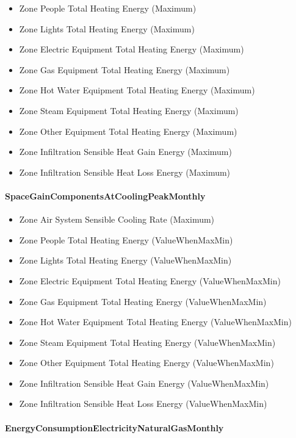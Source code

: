\begin{itemize}
\item
  Zone People Total Heating Energy (Maximum)
\item
  Zone Lights Total Heating Energy (Maximum)
\item
  Zone Electric Equipment Total Heating Energy (Maximum)
\item
  Zone Gas Equipment Total Heating Energy (Maximum)
\item
  Zone Hot Water Equipment Total Heating Energy (Maximum)
\item
  Zone Steam Equipment Total Heating Energy (Maximum)
\item
  Zone Other Equipment Total Heating Energy (Maximum)
\item
  Zone Infiltration Sensible Heat Gain Energy (Maximum)
\item
  Zone Infiltration Sensible Heat Loss Energy (Maximum)
\end{itemize}

\paragraph{SpaceGainComponentsAtCoolingPeakMonthly}\label{spacegaincomponentsatcoolingpeakmonthly}

\begin{itemize}
\item
  Zone Air System Sensible Cooling Rate (Maximum)
\item
  Zone People Total Heating Energy (ValueWhenMaxMin)
\item
  Zone Lights Total Heating Energy (ValueWhenMaxMin)
\item
  Zone Electric Equipment Total Heating Energy (ValueWhenMaxMin)
\item
  Zone Gas Equipment Total Heating Energy (ValueWhenMaxMin)
\item
  Zone Hot Water Equipment Total Heating Energy (ValueWhenMaxMin)
\item
  Zone Steam Equipment Total Heating Energy (ValueWhenMaxMin)
\item
  Zone Other Equipment Total Heating Energy (ValueWhenMaxMin)
\item
  Zone Infiltration Sensible Heat Gain Energy (ValueWhenMaxMin)
\item
  Zone Infiltration Sensible Heat Loss Energy (ValueWhenMaxMin)
\end{itemize}

\paragraph{EnergyConsumptionElectricityNaturalGasMonthly}\label{energyconsumptionelectricitynaturalgasmonthly}

